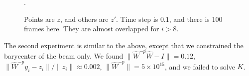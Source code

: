 \documentclass[twocolumn,a4paper]{article}
\begin{document}
\begin{figure}
  \centering
  \caption{Points are $z$, and others are $z'$. Time step is $0.1$, and there is
  100 frames here. They are almost overlapped for $i>8$.}
  \label{zzc}.
\end{figure}

The second experiment is similar to the above, except that we constrained the
barycenter of the beam only. We found $\|\hat{W}^{-p}\hat{W}-I\|=0.12$,
$\|\hat{W}^{-p}y_i-z_i\|/\|z_i\|\approx 0.002$,
$\|\hat{W}^{-p}\|=5\times10^{15}$, and we failed to solve $K$.
\end{document}
